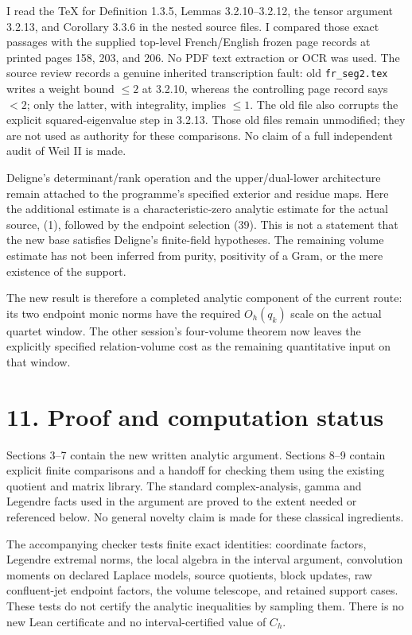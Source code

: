 I read the TeX for Definition 1.3.5, Lemmas 3.2.10--3.2.12, the tensor
argument 3.2.13, and Corollary 3.3.6 in the nested source files. I
compared those exact passages with the supplied top-level French/English
frozen page records at printed pages 158, 203, and 206. No PDF text
extraction or OCR was used. The source review records a genuine
inherited transcription fault: old \texttt{fr\_seg2.tex} writes a weight
bound \(\le2\) at 3.2.10, whereas the controlling page record says
\(<2\); only the latter, with integrality, implies \(\le1\). The old
file also corrupts the explicit squared-eigenvalue step in 3.2.13. Those
old files remain unmodified; they are not used as authority for these
comparisons. No claim of a full independent audit of Weil II is made.

Deligne's determinant/rank operation and the upper/dual-lower
architecture remain attached to the programme's specified exterior and
residue maps. Here the additional estimate is a characteristic-zero
analytic estimate for the actual source, (1), followed by the endpoint
selection (39). This is not a statement that the new base satisfies
Deligne's finite-field hypotheses. The remaining volume estimate has not
been inferred from purity, positivity of a Gram, or the mere existence
of the support.

The new result is therefore a completed analytic component of the
current route: its two endpoint monic norms have the required
\(O_h(q_k)\) scale on the actual quartet window. The other session's
four-volume theorem now leaves the explicitly specified relation-volume
cost as the remaining quantitative input on that window.

\section{11. Proof and computation
status}\label{proof-and-computation-status}

Sections 3--7 contain the new written analytic argument. Sections 8--9
contain explicit finite comparisons and a handoff for checking them
using the existing quotient and matrix library. The standard
complex-analysis, gamma and Legendre facts used in the argument are
proved to the extent needed or referenced below. No general novelty
claim is made for these classical ingredients.

The accompanying checker tests finite exact identities: coordinate
factors, Legendre extremal norms, the local algebra in the interval
argument, convolution moments on declared Laplace models, source
quotients, block updates, raw confluent-jet endpoint factors, the volume
telescope, and retained support cases. These tests do not certify the
analytic inequalities by sampling them. There is no new Lean certificate
and no interval-certified value of \(C_h\).

